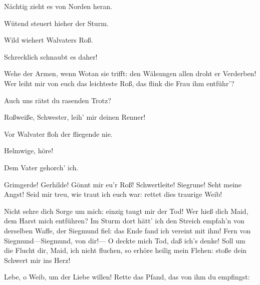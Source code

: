 \begin{drama}
\Waltrautespeaks


Nächtig zieht es von Norden heran.
 

\Ortlindespeaks


Wütend steuert hieher der Sturm.
 



Wild wiehert Walvaters Roß.
 

Schrecklich schnaubt es daher!
 

\Brunnhildespeaks
Wehe der Armen, wenn Wotan sie trifft:
den Wälsungen allen droht er Verderben!
Wer leiht mir von euch das leichteste Roß,
das flink die Frau ihm entführ'?
 

\Siegrunespeaks
Auch uns rätst du rasenden Trotz?
 

\Brunnhildespeaks
Roßweiße, Schwester,
leih' mir deinen Renner!
 

\Rossweissespeaks
Vor Walvater floh der fliegende nie.
 

\Brunnhildespeaks
Helmwige, höre!
 

\Helmwigespeaks
Dem Vater gehorch' ich.
 

\Brunnhildespeaks
Grimgerde! Gerhilde! Gönnt mir eu'r Roß!
Schwertleite! Siegrune! Seht meine Angst!
Seid mir treu, wie traut ich euch war:
rettet dies traurige Weib!
 

\Sieglindespeaks


Nicht sehre dich Sorge um mich:
einzig taugt mir der Tod!
Wer hieß dich Maid,
dem Harst mich entführen?
Im Sturm dort hätt' ich den Streich empfah'n
von derselben Waffe, der Siegmund fiel:
das Ende fand ich
vereint mit ihm!
Fern von Siegmund---Siegmund, von dir!---
O deckte mich Tod, daß ich's denke!
Soll um die Flucht
dir, Maid, ich nicht fluchen,
so erhöre heilig mein Flehen:
stoße dein Schwert mir ins Herz!
 

\Brunnhildespeaks
Lebe, o Weib, um der Liebe willen!
Rette das Pfand, das von ihm du empfingst:
 




\end{drama}
